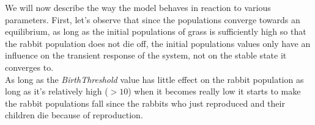 \documentclass[11pt]{article}
\begin{document}
We will now describe the way the model behaves in reaction to various parameters. First, let's observe that since the populations converge towards an equilibrium, as long as the initial populations of grass is sufficiently high so that the rabbit population does not die off, the initial populations values only have an influence on the transient response of the system, not on the stable state it converges to. \\

As long as the \textit{BirthThreshold} value has little effect on the rabbit population as long as it's relatively high ($>10$) when it becomes really low it starts to make the rabbit populations fall since the rabbits who just reproduced and their children die because of reproduction.
\end{document}
